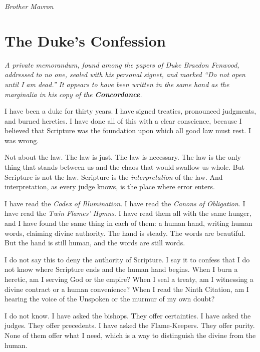\documentclass{book}
\begin{document}
\vspace{1em}

\noindent \textit{Brother Mavron}

\clearpage

\chapter*{The Duke's Confession}

\textit{A private memorandum, found among the papers of Duke Braedon Fenwood, addressed to no one, sealed with his personal signet, and marked ``Do not open until I am dead.'' It appears to have been written in the same hand as the marginalia in his copy of the \textbf{Concordance}.}

\vspace{1em}

I have been a duke for thirty years. I have signed treaties, pronounced judgments, and burned heretics. I have done all of this with a clear conscience, because I believed that Scripture was the foundation upon which all good law must rest. I was wrong.

Not about the law. The law is just. The law is necessary. The law is the only thing that stands between us and the chaos that would swallow us whole. But Scripture is not the law. Scripture is the \textit{interpretation} of the law. And interpretation, as every judge knows, is the place where error enters.

I have read the \textit{Codex of Illumination}. I have read the \textit{Canons of Obligation}. I have read the \textit{Twin Flames' Hymns}. I have read them all with the same hunger, and I have found the same thing in each of them: a human hand, writing human words, claiming divine authority. The hand is steady. The words are beautiful. But the hand is still human, and the words are still words.

I do not say this to deny the authority of Scripture. I say it to confess that I do not know where Scripture ends and the human hand begins. When I burn a heretic, am I serving God or the empire? When I seal a treaty, am I witnessing a divine contract or a human convenience? When I read the Ninth Citation, am I hearing the voice of the Unspoken or the murmur of my own doubt?

I do not know. I have asked the bishops. They offer certainties. I have asked the judges. They offer precedents. I have asked the Flame-Keepers. They offer purity. None of them offer what I need, which is a way to distinguish the divine from the human.
\end{document}
